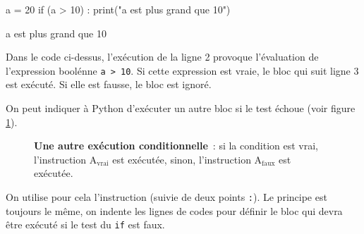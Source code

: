 \begin{multicols}{2}
\begin{pythonexemple}
a = 20
if (a > 10) :
    print("a est plus grand que 10")
\end{pythonexemple}

\begin{result}
a est plus grand que 10
\end{result}
\end{multicols}

Dans le code ci-dessus, l'exécution de la ligne 2 provoque l'évaluation de l'expression boolénne
\texttt{a~>~10}. Si cette expression est vraie, le bloc qui suit ligne 3 est exécuté.
Si elle est fausse, le bloc est ignoré.

On peut indiquer à Python d'exécuter un autre bloc si le test échoue (voir figure \ref{python:conditions:figures:ifelse}).

 \begin{figure}[h]
\caption{\textbf{Une autre exécution conditionnelle}~: si la condition est vrai, l'instruction
{\ttfamily $\text{A}_{\text{vrai}}$}
est exécutée, sinon, l'instruction {\ttfamily $\text{A}_{\text{faux}}$} est exécutée.}\label{python:conditions:figures:ifelse}
\centering
{}
\end{figure}


On utilise pour cela
l'instruction  (suivie de deux points \texttt{:}).
Le principe est toujours le même, on indente les lignes de codes
pour définir le bloc qui devra être exécuté si le test du \texttt{if} est faux.


